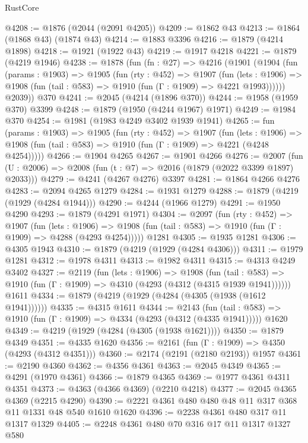 \begin{lexlean}{RustCore}
\begin{coremodule}
@4208 := @1876 (@2044 (@2091 @4205))
@4209 := @1862 @43
@4213 := @1864 (@1868 @43) (@1874 @43)
@4214 := @1883 @3396
@4216 := @1879 (@4214 @1898)
@4218 := @1921 (@1922 @43)
@4219 := @1917 @4218
@4221 := @1879 (@4219 @1946)
@4238 := @1878
    (fun (fn : @27) =>
    @4216
      (@1901
        (@1904
          (fun (params : @1903) =>
          @1905
            (fun (rty : @452) =>
            @1907
              (fun (lets : @1906) =>
              @1908 (fun (tail : @583) => @1910 (fun (Γ : @1909) => @4221 @1993))))))
        @2039))
    @370
@4241 := @2045 (@4214 (@1896 @370))
@4244 := @1958 (@1959 @370) @3399
@4248 := @1879 (@1950 (@4244 @1967) @1971)
@4249 := @1984 @370
@4254 := @1981 (@1983 @4249 @3402 @1939 @1941)
@4265 := fun (params : @1903) =>
  @1905
    (fun (rty : @452) =>
    @1907
      (fun (lets : @1906) =>
      @1908 (fun (tail : @583) => @1910 (fun (Γ : @1909) => @4221 (@4248 @4254)))))
@4266 := @1904 @4265
@4267 := @1901 @4266
@4276 := @2007 (fun (U : @2006) => @2008 (fun (t : @7) => @2016 (@1879 (@2022 @3399 @1897) @2033)))
@4279 := @4241 (@4267 @4276) @3397
@4281 := @1864 @4266 @4276
@4283 := @2094 @4265 @1279
@4284 := @1931 @1279
@4288 := @1879 (@4219 (@1929 (@4284 @1944)))
@4290 := @4244 (@1966 @1279)
@4291 := @1950 @4290
@4293 := @1879 (@4291 @1971)
@4304 := @2097
    (fun (rty : @452) =>
    @1907
      (fun (lets : @1906) =>
      @1908 (fun (tail : @583) => @1910 (fun (Γ : @1909) => @4288 (@4293 @4254)))))
    @1281
@4305 := @1935 @1281
@4306 := @4305 @1943
@4310 := @1879 (@4219 (@1929 (@4284 @4306)))
@4311 := @1979 @1281
@4312 := @1978 @4311
@4313 := @1982 @4311
@4315 := @4313 @4249 @3402
@4327 := @2119
    (fun (lets : @1906) =>
    @1908
      (fun (tail : @583) => @1910 (fun (Γ : @1909) => @4310 (@4293 (@4312 (@4315 @1939 @1941))))))
    @1611
@4334 := @1879 (@4219 (@1929 (@4284 (@4305 (@1938 (@1612 @1941))))))
@4335 := @4315 @1611
@4344 := @2143
    (fun (tail : @583) => @1910 (fun (Γ : @1909) => @4334 (@4293 (@4312 (@4335 @1941)))))
    @1620
@4349 := @4219 (@1929 (@4284 (@4305 (@1938 @1621))))
@4350 := @1879 @4349
@4351 := @4335 @1620
@4356 := @2161 (fun (Γ : @1909) => @4350 (@4293 (@4312 @4351)))
@4360 := @2174 (@2191 (@2180 @2193)) @1957
@4361 := @2190 @4360
@4362 := @4356 @4361
@4363 := @2045 @4349
@4365 := @4291 (@1970 @4361)
@4366 := @1879 @4365
@4369 := @1977 @4361 @4311 @4351
@4373 := @4363 (@4366 @4369) (@2210 @4218)
@4377 := @2045 @4365 @4369 (@2215 @4290)
@4390 := @2221 @4361 @480 @480 @48 @11 @317 @368 @11 @1331 @48 @540 @1610 @1620
@4396 := @2238 @4361 @480 @317 @11 @1317 @1329
@4405 := @2248 @4361 @480 @70 @316 @17 @11 @1317 @1327 @580

\end{coremodule}
\end{lexlean}
